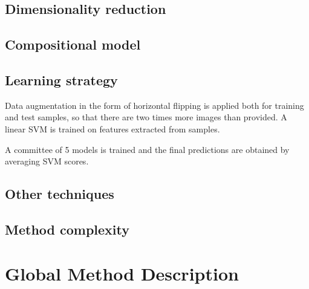 \documentclass{article}
\begin{document}
\subsection{Dimensionality reduction}

\subsection{Compositional model}

\subsection{Learning strategy}
Data augmentation in the form of horizontal flipping is applied both for training and test samples, so that there are two times more images than provided.
A linear SVM is trained on features extracted from samples.

A committee of 5 models is trained and the final predictions are obtained by averaging SVM scores.

\subsection{Other techniques}

\subsection{Method complexity}


\section{Global Method Description}
\end{document}

